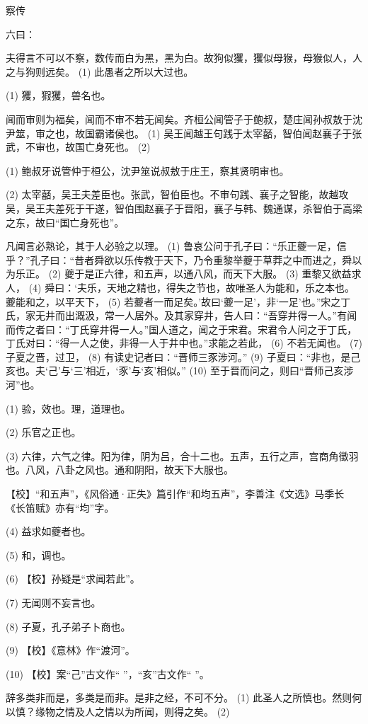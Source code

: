 \documentclass[12pt,UTF8]{ctexbook}
\begin{document}
察传


六曰：

夫得言不可以不察，数传而白为黑，黑为白。故狗似玃，玃似母猴，母猴似人，人之与狗则远矣。 (1) 此愚者之所以大过也。

(1) 玃，猳玃，兽名也。

闻而审则为福矣，闻而不审不若无闻矣。齐桓公闻管子于鲍叔，楚庄闻孙叔敖于沈尹筮，审之也，故国霸诸侯也。 (1) 吴王闻越王句践于太宰嚭，智伯闻赵襄子于张武，不审也，故国亡身死也。 (2)

(1) 鲍叔牙说管仲于桓公，沈尹筮说叔敖于庄王，察其贤明审也。

(2) 太宰嚭，吴王夫差臣也。张武，智伯臣也。不审句践、襄子之智能，故越攻吴，吴王夫差死于干遂，智伯围赵襄子于晋阳，襄子与韩、魏通谋，杀智伯于高梁之东，故曰“国亡身死也”。

凡闻言必熟论，其于人必验之以理。 (1) 鲁哀公问于孔子曰：“乐正夔一足，信乎？”孔子曰：“昔者舜欲以乐传教于天下，乃令重黎举夔于草莽之中而进之，舜以为乐正。 (2) 夔于是正六律，和五声，以通八风，而天下大服。 (3) 重黎又欲益求人， (4) 舜曰：‘夫乐，天地之精也，得失之节也，故唯圣人为能和，乐之本也。夔能和之，以平天下， (5) 若夔者一而足矣。’故曰‘夔一足’，非‘一足’也。”宋之丁氏，家无井而出溉汲，常一人居外。及其家穿井，告人曰：“吾穿井得一人。”有闻而传之者曰：“丁氏穿井得一人。”国人道之，闻之于宋君。宋君令人问之于丁氏，丁氏对曰：“得一人之使，非得一人于井中也。”求能之若此， (6) 不若无闻也。 (7) 子夏之晋，过卫， (8) 有读史记者曰：“晋师三豕涉河。” (9) 子夏曰：“非也，是己亥也。夫‘己’与‘三’相近，‘豕’与‘亥’相似。” (10) 至于晋而问之，则曰“晋师己亥涉河”也。

(1) 验，效也。理，道理也。

(2) 乐官之正也。

(3) 六律，六气之律。阳为律，阴为吕，合十二也。五声，五行之声，宫商角徵羽也。八风，八卦之风也。通和阴阳，故天下大服也。

【校】“和五声”，《风俗通·正失》篇引作“和均五声”，李善注《文选》马季长《长笛赋》亦有“均”字。

(4) 益求如夔者也。

(5) 和，调也。

(6) 【校】孙疑是“求闻若此”。

(7) 无闻则不妄言也。

(8) 子夏，孔子弟子卜商也。

(9) 【校】《意林》作“渡河”。

(10) 【校】案“己”古文作“ ”，“亥”古文作“ ”。

辞多类非而是，多类是而非。是非之经，不可不分。 (1) 此圣人之所慎也。然则何以慎？缘物之情及人之情以为所闻，则得之矣。 (2)
\end{document}
